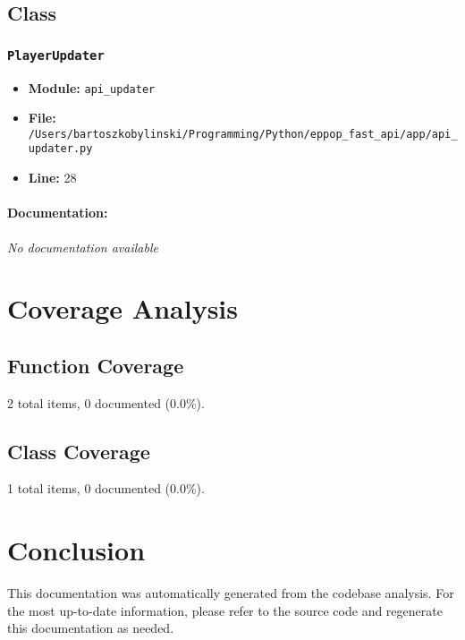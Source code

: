 \documentclass[11pt,a4paper]{article}
\begin{document}
\vspace{1em}
\subsection{Class}

\subsubsection{\texttt{PlayerUpdater}}

\begin{itemize}
    \item \textbf{Module:} \texttt{api\_updater}
    \item \textbf{File:} \texttt{/Users/bartoszkobylinski/Programming/Python/eppop\_fast\_api/app/api\_updater.py}
    \item \textbf{Line:} 28
\end{itemize}

\paragraph{Documentation:} \textit{No documentation available}


\vspace{1em}


\section{Coverage Analysis}

\subsection{Function Coverage}

2 total items, 0 documented (0.0\%).

\subsection{Class Coverage}

1 total items, 0 documented (0.0\%).


\section{Conclusion}

This documentation was automatically generated from the codebase analysis. For the most up-to-date information, please refer to the source code and regenerate this documentation as needed.
\end{document}
